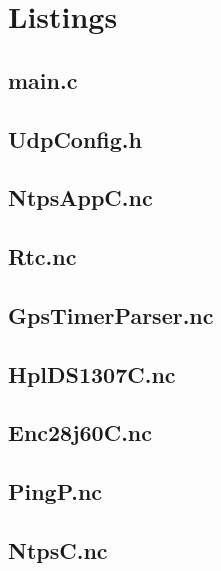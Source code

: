\documentclass[12pt,a4paper,titlepage,oneside]{article}
\begin{document}
\section{Listings}
\small{

\subsection{main.c}


\subsection{UdpConfig.h}


\subsection{NtpsAppC.nc}


\subsection{Rtc.nc}


\subsection{GpsTimerParser.nc}


\subsection{HplDS1307C.nc}


\subsection{Enc28j60C.nc}


\subsection{PingP.nc}


\subsection{NtpsC.nc}


}
\end{document}
